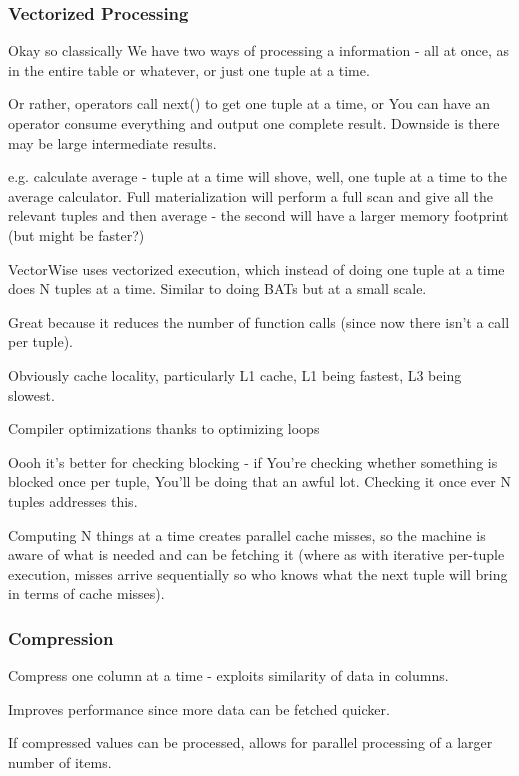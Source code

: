 \documentclass{article}
\begin{document}
		\subsubsection{Vectorized Processing}
		
			Okay so classically We have two ways of processing a information - all at once, as in the entire table or whatever, or just one tuple at a time.
			
			Or rather, operators call next() to get one tuple at a time, or You can have an operator consume everything and output one complete result. Downside is there may be large intermediate results.
			
			e.g. calculate average - tuple at a time will shove, well, one tuple at a time to the average calculator. Full materialization will perform a full scan and give all the relevant tuples and then average - the second will have a larger memory footprint (but might be faster?)
			
			VectorWise uses vectorized execution, which instead of doing one tuple at a time does N tuples at a time. Similar to doing BATs but at a small scale.
			
			Great because it reduces  the number of function calls (since now there isn't a call per tuple).
			
			Obviously cache locality, particularly L1 cache, L1 being fastest, L3 being slowest.
			
			Compiler optimizations thanks to optimizing loops
			
			Oooh it's better for checking blocking - if You're checking whether something is blocked once per tuple, You'll be doing that an awful lot. Checking it once ever N tuples addresses this.
			
			Computing N things at a time creates parallel cache misses, so the machine is aware of what is needed and can be fetching it (where as with iterative per-tuple execution, misses arrive sequentially so who knows what the next tuple will bring in terms of cache misses).
			
		\subsubsection{Compression}
			
			Compress one column at a time - exploits similarity of data in columns.
			
			Improves performance since more data can be fetched quicker.
			
			If compressed values can be processed, allows for parallel processing of a larger number of items.
			
\end{document}
